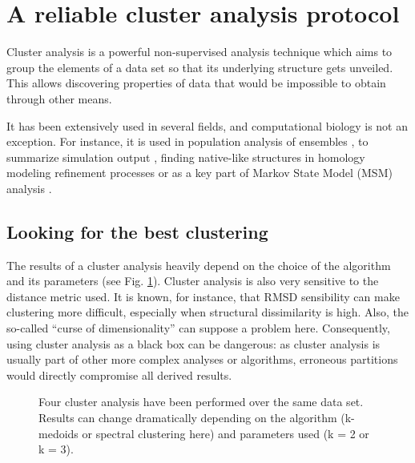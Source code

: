 \section{A reliable cluster analysis protocol}

Cluster analysis is a powerful non-supervised analysis technique which aims to group the elements of a data set so
that its underlying structure gets unveiled. This allows discovering properties of data that would be impossible to
obtain through other means. 

It has been extensively used in several fields, and computational biology is not an exception. For instance, it is used in
population analysis of ensembles \cite{shao_clustering_2007}, to summarize simulation output
\cite{fraccalvieri_self_2013, phillips_validating_2011}, finding native-like structures in homology modeling refinement processes \cite{raval_refinement_2012} or as a key part of Markov State Model (MSM) analysis \cite{pande_everything_2010}.

\subsection{Looking for the best clustering}

The results of a cluster analysis heavily depend on the choice of the algorithm and its parameters (see Fig.
\ref{fig:pyproct_cluster_methods}). Cluster analysis is also very sensitive to the distance metric
used. It is known, for instance, that RMSD sensibility can make clustering more difficult, especially when structural
dissimilarity is high. Also, the so-called ``curse of dimensionality'' can suppose a problem here. Consequently, using
cluster analysis as a black box can be dangerous: as cluster analysis is usually part of other more complex analyses or
algorithms, erroneous partitions would directly compromise all derived results. 

\begin{figure}


\caption{Four cluster analysis have been performed over the same data set. Results can change
dramatically depending on the algorithm (k-medoids or spectral clustering here) and parameters used (k = 2 or k = 3).}

\label{fig:pyproct_cluster_methods}

\end{figure}

